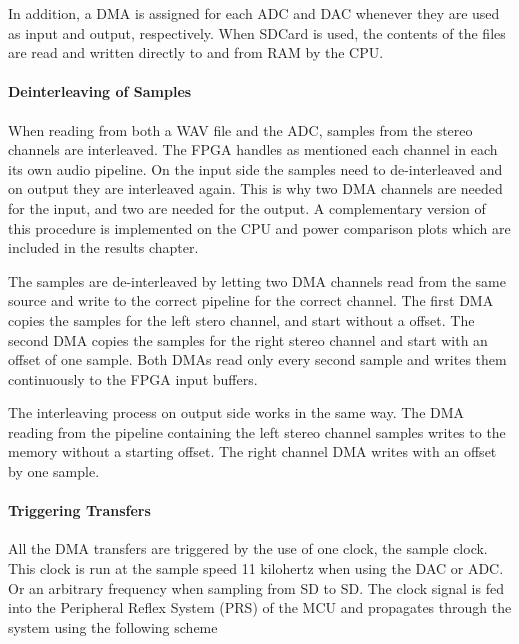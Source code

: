 
In addition, a DMA is assigned for each ADC and DAC whenever they are used as
input and output, respectively. When SDCard is used, the contents of the files
are read and written directly to and from RAM by the CPU.

\paragraph{Deinterleaving of Samples}
When reading from both a WAV file and the ADC, samples from the stereo channels
are interleaved. The FPGA handles as mentioned each channel in each its own
audio pipeline. On the input side the samples need to de-interleaved and on
output they are interleaved again. This is why two DMA channels are needed for
the input, and two are needed for the output. A complementary version of this
procedure is implemented on the CPU and power comparison plots which are
included in the results chapter. 


The samples are de-interleaved by letting two DMA channels read from the same
source and write to the correct pipeline for the correct channel. The first DMA
copies the samples for the left stero channel, and start without a offset. The
second DMA copies the samples for the right stereo channel and start with an
offset of one sample. Both DMAs read only every second sample and writes them
continuously to the FPGA input buffers.

The interleaving process on output side works in the same way. The DMA reading
from the pipeline containing the left stereo channel samples writes to the
memory without a starting offset. The right channel DMA writes with an offset by
one sample.

\paragraph{Triggering Transfers}

All the DMA transfers are triggered by the use of one clock, the sample clock.
This clock is run at the sample speed 11 kilohertz when using the DAC or ADC. Or
an arbitrary frequency when sampling from SD to SD. The clock signal is fed into
the Peripheral Reflex System (PRS) of the MCU and propagates through the system
using the following scheme

